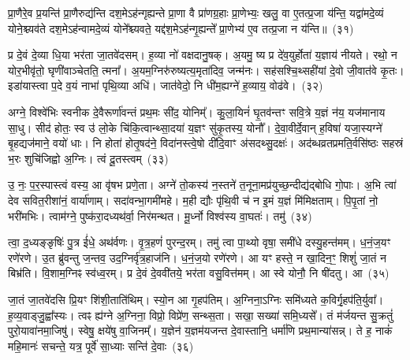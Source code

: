 प्रा॒णैरे॒व प्र॒यन्ति॑ प्रा॒णैरुद्य॑न्ति दश॒मे\-ऽह॑न्गृह्यन्ते प्रा॒णा वै प्रा॑णग्र॒हाः प्रा॒णेभ्यः॒ खलु॒ वा ए॒तत्प्र॒जा य॑न्ति॒ यद्वा॑मदे॒व्यं योने॒श्च्यव॑ते दश॒मे\-ऽह॑न्वामदे॒व्यं योने᳚श्च्यवते॒ यद्द॑श॒मे\-ऽह॑न्गृ॒ह्यन्ते᳚ प्रा॒णेभ्य॑ ए॒व तत्प्र॒जा न य॑न्ति॥~(३१)

{\anuvakamend[{तत्प्रा॑णग्र॒हाः स॒प्तत्रिꣳ॑शच्च}]}%

प्र दे॒वं दे॒व्या धि॒या भर॑ता जा॒तवे॑दसम्। ह॒व्या नो॑ वक्षदानु॒षक्। अ॒यमु॒ ष्य प्र दे॑व॒युर्\mbox{}होता॑ य॒ज्ञाय॑ नीयते। रथो॒ न योर॒भीवृ॑तो॒ घृणी॑वाञ्चेतति॒ त्मना᳚। अ॒यम॒ग्निरु॑रुष्यत्य॒मृता॑दिव॒ जन्म॑नः। सह॑सश्चि॒थ्सही॑यां दे॒वो जी॒वात॑वे कृ॒तः। इडा॑यास्त्वा प॒दे व॒यं नाभा॑ पृथि॒व्या अधि॑। जात॑वेदो॒ नि धी॑म॒ह्यग्ने॑ ह॒व्याय॒ वोढ॑वे।~(३२)

अग्ने॒ विश्वे॑भिः स्वनीक दे॒वैरूर्णा॑वन्तं प्रथ॒मः सी॑द॒ योनिम्᳚। कु॒ला॒यिनं॑ घृ॒तव॑न्तꣳ सवि॒त्रे य॒ज्ञं न॑य॒ यज॑मानाय सा॒धु। सीद॑ होतः॒ स्व उ॑ लो॒के चि॑कि॒त्वान्थ्सा॒दया॑ य॒ज्ञꣳ सु॑कृ॒तस्य॒ योनौ᳚। दे॒वा॒वीर्दे॒वान् ह॒विषा॑ यजा॒स्यग्ने॑ बृ॒हद्यज॑माने॒ वयो॑ धाः। नि होता॑ होतृ॒षद॑ने॒ विदा॑नस्त्वे॒षो दी॑दि॒वाꣳ अ॑सदथ्सु॒दक्षः॑। अद॑ब्धव्रतप्रमति॒र्वसि॑ष्ठः सहस्रं भ॒रः शुचि॑जिह्वो अ॒ग्निः। त्वं दू॒तस्त्वम्~(३३)

उ॒ नः॒ प॒र॒स्पास्त्वं वस्य॒ आ वृ॑षभ प्रणे॒ता। अग्ने॑ तो॒कस्य॑ न॒स्तने॑ त॒नूना॒मप्र॑युच्छ॒न्दीद्य॑द्बोधि गो॒पाः। अ॒भि त्वा॑ देव सवित॒रीशा॑नं॒ वार्या॑णाम्। सदा॑वन्भा॒गमी॑महे। म॒ही द्यौः पृ॑थि॒वी च॑ न इ॒मं य॒ज्ञं मि॑मिक्षताम्। पि॒पृ॒तां नो॒ भरी॑मभिः। त्वाम॑ग्ने॒ पुष्क॑रा॒दध्यथ॑र्वा॒ निर॑मन्थत। मू॒र्ध्नो विश्व॑स्य वा॒घतः॑। तमु॑~(३४)

त्वा॒ द॒ध्यङ्ङृषिः॑ पु॒त्र ई॑धे॒ अथ॑र्वणः। वृ॒त्र॒हणं॑ पुरन्द॒रम्। तमु॑ त्वा पा॒थ्यो वृषा॒ समी॑धे दस्यु॒हन्त॑मम्। ध॒नं॒ज॒यꣳ रणे॑रणे। उ॒त ब्रु॑वन्तु ज॒न्तव॒ उद॒ग्निर्वृ॑त्र॒हाज॑नि। ध॒नं॒ज॒यो रणे॑रणे। आ यꣳ हस्ते॒ न खा॒दिन॒ꣳ॒ शिशुं॑ जा॒तं न बिभ्र॑ति। वि॒शाम॒ग्निꣴ स्व॑ध्व॒रम्। प्र दे॒वं दे॒ववी॑तये॒ भर॑ता वसु॒वित्त॑मम्। आ स्वे योनौ॒ नि षी॑दतु। आ~(३५)


जा॒तं जा॒तवे॑दसि प्रि॒यꣳ शि॑शी॒ताति॑थिम्। स्यो॒न आ गृ॒हप॑तिम्। अ॒ग्निना॒ऽग्निः समि॑ध्यते क॒विर्गृ॒हप॑ति॒र्युवा᳚। ह॒व्य॒वाड्जु॒ह्वा᳚स्यः। त्वꣴ ह्य॑ग्ने अ॒ग्निना॒ विप्रो॒ विप्रे॑ण॒ सन्थ्स॒ता। सखा॒ सख्या॑ समि॒ध्यसे᳚। तं म॑र्जयन्त सु॒क्रतुं॑ पुरो॒यावा॑नमा॒जिषु॑। स्वेषु॒ क्षये॑षु वा॒जिनम्᳚। य॒ज्ञेन॑ य॒ज्ञम॑यजन्त दे॒वास्तानि॒ धर्मा॑णि प्रथ॒मान्या॑सन्न्। ते ह॒ नाकं॑ महि॒मानः॑ सचन्ते॒ यत्र॒ पूर्वे॑ सा॒ध्याः सन्ति॑ दे॒वाः~(३६)
{\anuvakamend[{वोढ॑वे दू॒तस्त्वन्तमु॑ सीद॒त्वा यत्र॑ च॒त्वारि॑ च}]}%
{}
